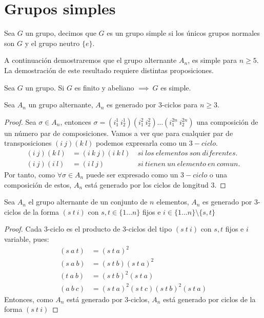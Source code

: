 \section{Grupos simples}

\begin{dfn}
	\label{dfn:simple}
	Sea $G$ un grupo, decimos que $G$ es un grupo simple si los únicos grupos normales son $G$ y el grupo neutro $\{e\}.$
\end{dfn}

A continuación demostraremos que el grupo alternante $A_n$, es simple para $n\geq 5$. La demostración de este resultado requiere distintas proposiciones.
\begin{pro}
	Sea $G$ un grupo. Si $G$ es finito y abeliano $\implies\ G$ es simple.
\end{pro}
\begin{pro}
	Sea $A_n$ un grupo alternante, $A_n$ es generado por 3-ciclos para $n\geq 3$.
\end{pro}
\begin{proof}
	Sea $\sigma \in A_n$, entonces $\sigma = (i_1^1\ i_2^1)(i_1^2\ i_2^2)\ldots(i_1^{2n}\ i_2^{2n})$ una composición de un número par de composiciones. Vamos a ver que para cualquier par de transposiciones $(i\ j)(k\ l)$ podemos expresarla como un $3-ciclo$.
	\begin{align*}
	(i\ j)(k\ l) &= (i\ k\ j)(i\ k\ l)\ &si\ los\ elementos\ son\ diferentes.\\
	(i\ j)(i\ l) &= (i\ l\ j)\ &si\ tienen\ un\ elemento\ en\ comun.
	\end{align*}
	Por tanto, como $\forall \sigma \in A_n$ puede ser expresado como un $3-ciclo$ o una composición de estos, $A_n$ está generado por los ciclos de longitud 3.
\end{proof}
\begin{pro}
	\label{pro:alternante3ciclos}
	Sea $A_n$ el grupo alternante de un conjunto de $n$ elementos, $A_n$ es generado por 3-ciclos de la forma $(s\ t\ i)$ con $s,t\in \{1\ldots n\}$ fijos e $i\in\{1\ldots n\}\setminus\{s,t\}$
\end{pro}
\begin{proof}
	Cada 3-ciclo es el producto de 3-ciclos del tipo $(s\ t\ i)$ con $s,t$ fijos e $i$ variable, pues:
	\begin{align*}
	(s\ a\ t) &= (s\ t\ a)^2\\
	(s\ a\ b) &= (s\ t\ b)(s\ t\ a)^2\\
	(t\ a\ b) &= (s\ t\ b)^2(s\ t\ a)\\
	(a\ b\ c) &= (s\ t\ a)^2(s\ t\ c)(s\ t\ b)^2(s\ t\ a)
	\end{align*}
	Entonces, como $A_n$ está generado por 3-ciclos, $A_n$ está generado por ciclos de la forma $(s\ t\ i)$
\end{proof}
